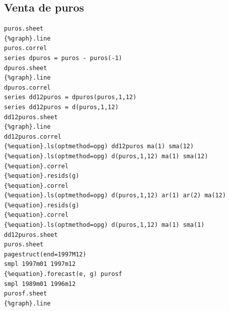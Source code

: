 \documentclass[12pt,a4paper,twoside,openright,titlepage,final]{article}
\begin{document}
\subsection{Venta de puros}


\begin{verbatim}
puros.sheet
{%graph}.line
puros.correl
series dpuros = puros - puros(-1)
dpuros.sheet
{%graph}.line
dpuros.correl
series dd12puros = dpuros(puros,1,12)
series dd12puros = d(puros,1,12)
dd12puros.sheet
{%graph}.line
dd12puros.correl
{%equation}.ls(optmethod=opg) dd12puros ma(1) sma(12)
{%equation}.ls(optmethod=opg) d(puros,1,12) ma(1) sma(12)
{%equation}.correl
{%equation}.resids(g)
{%equation}.correl
{%equation}.ls(optmethod=opg) d(puros,1,12) ar(1) ar(2) ma(12)
{%equation}.resids(g)
{%equation}.correl
{%equation}.ls(optmethod=opg) d(puros,1,12) ma(1) sma(1)
dd12puros.sheet
puros.sheet
pagestruct(end=1997M12)
smpl 1997m01 1997m12
{%equation}.forecast(e, g) purosf
smpl 1989m01 1996m12
purosf.sheet
{%graph}.line
\end{verbatim}
\end{document}
